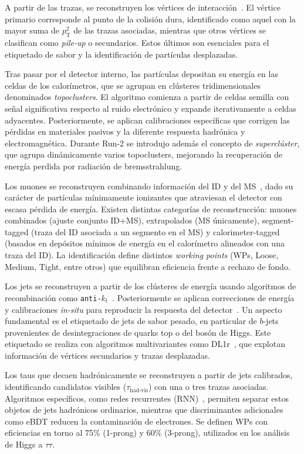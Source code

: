 A partir de las trazas, se reconstruyen los vértices de interacción~\cite{vertex_run1,vertex_run2,vertex_run3,vertex_run3_2}. El vértice primario corresponde al punto de la colisión dura, identificado como aquel con la mayor suma de $p_{\mathrm{T}}^{2}$ de las trazas asociadas, mientras que otros vértices se clasifican como \textit{pile-up} o secundarios. Estos últimos son esenciales para el etiquetado de sabor y la identificación de partículas desplazadas.

Tras pasar por el detector interno, las partículas depositan su energía en las celdas de los calorímetros, que se agrupan en clústeres tridimensionales denominados \textit{topoclusters}. El algoritmo comienza a partir de celdas semilla con señal significativa respecto al ruido electrónico y expande iterativamente a celdas adyacentes. Posteriormente, se aplican calibraciones específicas que corrigen las pérdidas en materiales pasivos y la diferente respuesta hadrónica y electromagnética. Durante Run-2 se introdujo además el concepto de \textit{superclúster}, que agrupa dinámicamente varios topoclusters, mejorando la recuperación de energía perdida por radiación de bremsstrahlung.

Los muones se reconstruyen combinando información del ID y del MS~\cite{muon_reco_run2}, dado su carácter de partículas mínimamente ionizantes que atraviesan el detector con escasa pérdida de energía. Existen distintas categorías de reconstrucción: muones combinados (ajuste conjunto ID+MS), extrapolados (MS únicamente), segment-tagged (traza del ID asociada a un segmento en el MS) y calorimeter-tagged (basados en depósitos mínimos de energía en el calorímetro alineados con una traza del ID). La identificación define distintos \textit{working points} (WPs, Loose, Medium, Tight, entre otros) que equilibran eficiencia frente a rechazo de fondo.

Los jets se reconstruyen a partir de los clústeres de energía usando algoritmos de recombinación como \texttt{anti-$k_{t}$}~\cite{Cacciari_2008}. Posteriormente se aplican correcciones de energía y calibraciones \textit{in-situ} para reproducir la respuesta del detector~\cite{jets_calib}. Un aspecto fundamental es el etiquetado de jets de sabor pesado, en particular de $b$-jets provenientes de desintegraciones de quarks top o del bosón de Higgs. Este etiquetado se realiza con algoritmos multivariantes como DL1r~\cite{tagging}, que explotan información de vértices secundarios y trazas desplazadas.

Los taus que decaen hadrónicamente se reconstruyen a partir de jets calibrados, identificando candidatos visibles ($\tau_{\text{had-vis}}$) con una o tres trazas asociadas. Algoritmos específicos, como redes recurrentes (RNN)~\cite{ATL-PHYS-PUB-2022-044}, permiten separar estos objetos de jets hadrónicos ordinarios, mientras que discriminantes adicionales como eBDT reducen la contaminación de electrones. Se definen WPs con eficiencias en torno al 75\% (1-prong) y 60\% (3-prong), utilizados en los análisis de Higgs a $\tau\tau$.

